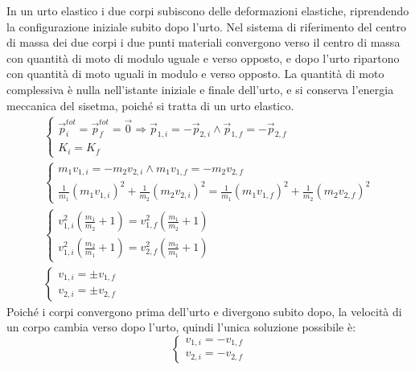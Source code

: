 \documentclass{article}
\numberwithin{equation}{subsection}
\begin{document}
In un urto elastico i due corpi subiscono delle deformazioni elastiche, riprendendo la configurazione iniziale subito dopo l'urto. 
Nel sistema di riferimento del 
centro di massa dei due corpi i due punti materiali convergono verso il centro di massa con quantità di moto di modulo uguale e verso opposto, e dopo l'urto ripartono con 
quantità di moto uguali in modulo e verso opposto. La quantità di moto 
complessiva è nulla nell'istante iniziale e finale dell'urto, e si conserva l'energia meccanica del sisetma, poiché si tratta di un urto elastico. 
\begin{gather*}
    \begin{cases}
        \vec{p}^{tot}_i=\vec{p}^{tot}_f=\vec{0}\Rightarrow \vec{p}_{1,i}=-\vec{p}_{2,i}\land\vec{p}_{1,f}=-\vec{p}_{2,f}\\
        K_i=K_f
    \end{cases}\\
    \begin{cases}
        m_1v_{1,i}=-m_2v_{2,i}\land m_1v_{1,f}=-m_2v_{2,f}\\
        \displaystyle\frac{1}{m_1}(m_1v_{1,i})^2+\frac{1}{m_2}(m_2v_{2,i})^2=\frac{1}{m_1}(m_1v_{1,f})^2+\frac{1}{m_2}(m_2v_{2,f})^2
    \end{cases}\\
    \begin{cases}
        \displaystyle v_{1,i}^2\left(\displaystyle\frac{m_1}{m_2}+1\right)=v_{1,f}^2\left(\displaystyle\frac{m_1}{m_2}+1\right)\\
        \displaystyle v_{1,i}^2\left(\displaystyle\frac{m_2}{m_1}+1\right)=v_{2,f}^2\left(\displaystyle\frac{m_2}{m_1}+1\right)
    \end{cases}\\
    \begin{cases}
        v_{1,i}=\pm v_{1,f}\\
        v_{2,i}=\pm v_{2,f}
    \end{cases}     
\end{gather*}
Poiché i corpi convergono prima dell'urto e divergono subito 
dopo, la velocità di un corpo cambia verso dopo l'urto, quindi 
l'unica soluzione possibile è:
\begin{equation}
    \begin{cases}
        v_{1,i}=-v_{1,f}\\
        v_{2,i}=-v_{2,f}
    \end{cases}
\end{equation}
\end{document}
